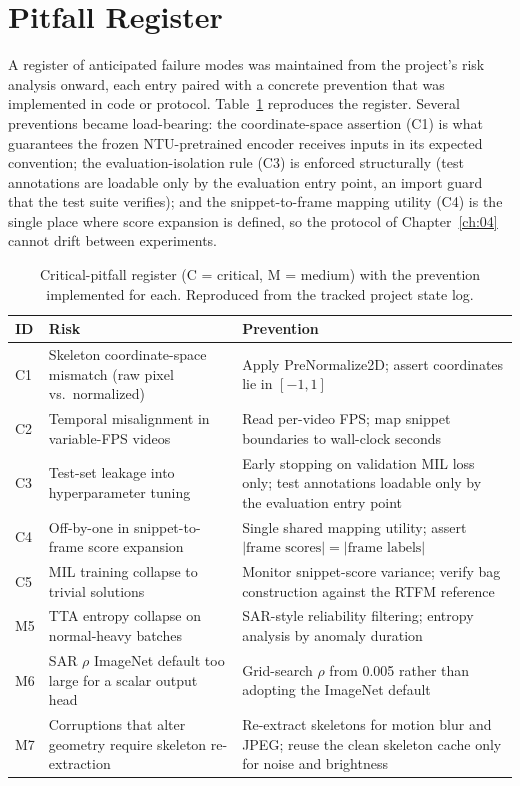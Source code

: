 \section{Pitfall Register}
\label{sec:appd-pitfalls}

A register of anticipated failure modes was maintained from the project's risk
analysis onward, each entry paired with a concrete prevention that was
implemented in code or protocol. Table~\ref{tab:appd-pitfalls} reproduces the
register. Several preventions became load-bearing: the coordinate-space
assertion (C1) is what guarantees the frozen NTU-pretrained encoder receives
inputs in its expected convention; the evaluation-isolation rule (C3) is
enforced structurally (test annotations are loadable only by the evaluation
entry point, an import guard that the test suite verifies); and the
snippet-to-frame mapping utility (C4) is the single place where score
expansion is defined, so the protocol of Chapter~\ref{ch:04} cannot drift
between experiments.

\begin{table}[htbp]
\centering
\caption{Critical-pitfall register (C = critical, M = medium) with the
prevention implemented for each. Reproduced from the tracked project state
log.}
\label{tab:appd-pitfalls}
\small
\begin{tabular}{@{}p{0.6cm}p{6.2cm}p{6.6cm}@{}}
\toprule
ID & Risk & Prevention \\
\midrule
C1 & Skeleton coordinate-space mismatch (raw pixel vs.\ normalized) &
Apply PreNormalize2D; assert coordinates lie in $[-1,1]$ \\
C2 & Temporal misalignment in variable-FPS videos &
Read per-video FPS; map snippet boundaries to wall-clock seconds \\
C3 & Test-set leakage into hyperparameter tuning &
Early stopping on validation MIL loss only; test annotations loadable only by
the evaluation entry point \\
C4 & Off-by-one in snippet-to-frame score expansion &
Single shared mapping utility; assert
$|\text{frame scores}| = |\text{frame labels}|$ \\
C5 & MIL training collapse to trivial solutions &
Monitor snippet-score variance; verify bag construction against the RTFM
reference \\
M5 & TTA entropy collapse on normal-heavy batches &
SAR-style reliability filtering; entropy analysis by anomaly duration \\
M6 & SAR $\rho$ ImageNet default too large for a scalar output head &
Grid-search $\rho$ from 0.005 rather than adopting the ImageNet default \\
M7 & Corruptions that alter geometry require skeleton re-extraction &
Re-extract skeletons for motion blur and JPEG; reuse the clean skeleton cache
only for noise and brightness \\
\bottomrule
\end{tabular}
\end{table}

